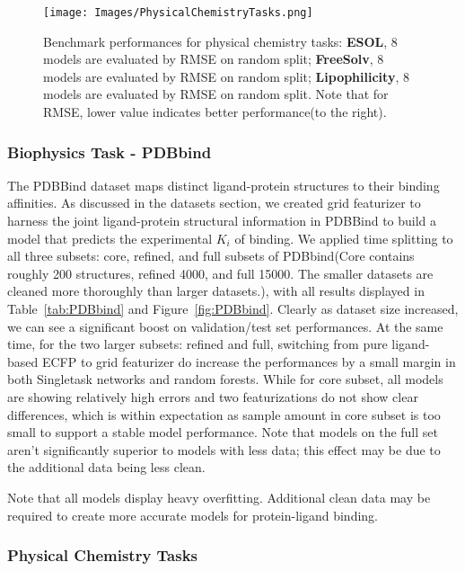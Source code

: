 \begin{figure}[!h]
  \centering
  \texttt{[image: Images/PhysicalChemistryTasks.png]}
  \caption{Benchmark performances for physical chemistry tasks: \textbf{ESOL}, 8 models are evaluated by RMSE on random split; \textbf{FreeSolv}, 8 models are evaluated by RMSE on random split; \textbf{Lipophilicity}, 8 models are evaluated by RMSE on random split. Note that for RMSE, lower value indicates better performance(to the right).}
  \label{fig:ESOL_FreeSolv_Lipo}
\end{figure}

\subsubsection{Biophysics Task - PDBbind}

The PDBBind dataset maps distinct ligand-protein structures to their binding affinities. As discussed in the datasets section, we created grid featurizer to harness the joint ligand-protein structural information in PDBBind to build a model that predicts the experimental $K_i$ of binding. We applied time splitting to all three subsets: core, refined, and full subsets of PDBbind(Core contains roughly 200 structures, refined 4000, and full 15000. The smaller datasets are cleaned more thoroughly than larger datasets.), with all results displayed in Table~\ref{tab:PDBbind} and Figure~\ref{fig:PDBbind}. Clearly as dataset size increased, we can see a significant boost on validation/test set performances. At the same time, for the two larger subsets: refined and full, switching from pure ligand-based ECFP to grid featurizer do increase the performances by a small margin in both Singletask networks and random forests. While for core subset, all models are showing relatively high errors and two featurizations do not show clear differences, which is within expectation as sample amount in core subset is too small to support a stable model performance. Note that models on the full set aren't significantly superior to models with less data; this effect may be due to the additional data being less clean.

Note that all models display heavy overfitting. Additional clean data may be required to create more accurate models for protein-ligand binding.

\subsubsection{Physical Chemistry Tasks}

